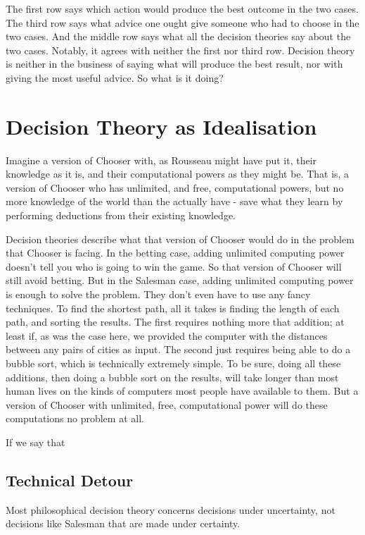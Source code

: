 \documentclass[
  letterpaper,
  DIV=11,
  numbers=noendperiod]{scrartcl}
\begin{document}
The first row says which action would produce the best outcome in the
two cases. The third row says what advice one ought give someone who had
to choose in the two cases. And the middle row says what all the
decision theories say about the two cases. Notably, it agrees with
neither the first nor third row. Decision theory is neither in the
business of saying what will produce the best result, nor with giving
the most useful advice. So what is it doing?

\section{Decision Theory as
Idealisation}\label{decision-theory-as-idealisation}

Imagine a version of Chooser with, as Rousseau might have put it, their
knowledge as it is, and their computational powers as they might be.
That is, a version of Chooser who has unlimited, and free, computational
powers, but no more knowledge of the world than the actually have - save
what they learn by performing deductions from their existing knowledge.

Decision theories describe what that version of Chooser would do in the
problem that Chooser is facing. In the betting case, adding unlimited
computing power doesn't tell you who is going to win the game. So that
version of Chooser will still avoid betting. But in the Salesman case,
adding unlimited computing power is enough to solve the problem. They
don't even have to use any fancy techniques. To find the shortest path,
all it takes is finding the length of each path, and sorting the
results. The first requires nothing more that addition; at least if, as
was the case here, we provided the computer with the distances between
any pairs of cities as input. The second just requires being able to do
a bubble sort, which is technically extremely simple. To be sure, doing
all these additions, then doing a bubble sort on the results, will take
longer than most human lives on the kinds of computers most people have
available to them. But a version of Chooser with unlimited, free,
computational power will do these computations no problem at all.

If we say that

\subsection{Technical Detour}\label{technical-detour}

Most philosophical decision theory concerns decisions under uncertainty,
not decisions like Salesman that are made under certainty.
\end{document}
